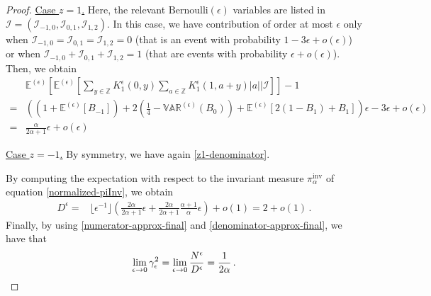 \documentclass[10pt,a4paper]{amsart}
\begin{document}
\begin{proof}
	\item{\underline{Case $z=1$.}} Here, the relevant $\text{Bernoulli}(\epsilon)$ variables are listed in  $\bm{\mathcal{I}}=(\mathcal{I}_{-1,0},\mathcal{I}_{0,1},\mathcal{I}_{1,2})$. 	 In this case, we have contribution of order at most $\epsilon$ only when $\mathcal{I}_{-1,0}=\mathcal{I}_{0,1}=\mathcal{I}_{1,2}=0$ (that is an event with probability $1-3\epsilon+o(\epsilon)$) or when  $\mathcal{I}_{-1,0}+\mathcal{I}_{0,1}+\mathcal{I}_{1,2}=1$ (that are events with probability $\epsilon+o(\epsilon)$). Then, we obtain
	\begin{equation}\label{z1-denominator}
		\begin{split}
			&\mathbb{E}^{(\epsilon)}\left[\mathbb{E}^{(\epsilon)}\left[\sum_{y\in \mathbb{Z}}K_{1}^{\epsilon}(0,y)\sum_{a\in \mathbb{Z}}K_{1}^{\epsilon}(1,a+y)|a|\bigg| \bm{\mathcal{I}}\right]\right]-1
\\=&
			  \left(\left(1+\mathbb{E}^{(\epsilon)}[B_{-1}]\right)+2\left(\frac{1}{4}-\mathbb{VAR}^{(\epsilon)}(B_{0})\right)
			  +\mathbb{E}^{(\epsilon)}[2(1-B_{1})+B_{1}]\right)\epsilon-3\epsilon+o(\epsilon)
\\=&
		\frac{\alpha}{2\alpha+1}\epsilon+o(\epsilon)
		\end{split}
	\end{equation}
\item{\underline{Case $z=-1$.}}  By symmetry, we have again \eqref{z1-denominator}.

	By computing the expectation with respect to the invariant measure $\pi^{\text{inv}}_{\alpha}$ of equation \eqref{normalized-piInv}, we obtain 
	\begin{equation}\label{denominator-approx-final}
		\begin{split}
			D^{\epsilon}=&\lfloor\epsilon^{-1}\rfloor\left(\frac{2\alpha}{2\alpha+1}\epsilon+\frac{2\alpha}{2\alpha+1}\frac{\alpha+1}{\alpha}\epsilon\right)+o(1)=2+o(1)\,.
		\end{split}
	\end{equation}
	Finally, by using \eqref{numerator-approx-final} and \eqref{denominator-approx-final}, we have that
	\begin{equation*}
		\lim_{\epsilon\to 0}\gamma_{\epsilon}^{2}=  \lim_{\epsilon\to 0}\frac{N^{\epsilon}}{D^{\epsilon}}=\frac{1}{{\color{black}2}\alpha}\,.
	\end{equation*}
\end{proof}
\end{document}
